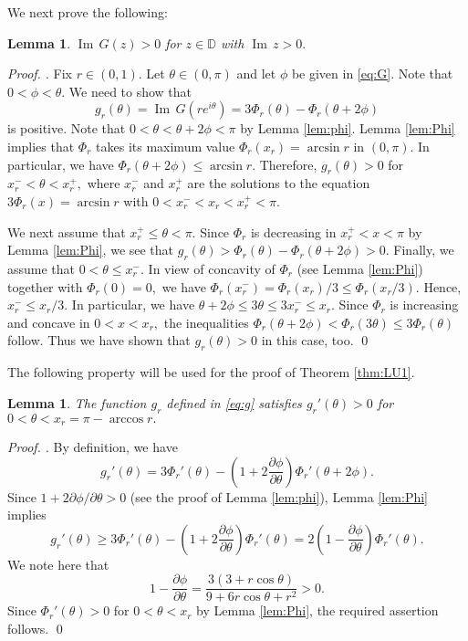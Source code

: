 \documentclass[a4paper,12pt]{amsart}
\numberwithin{equation}{section}
\newtheorem{lem}[thm]{Lemma}
\theoremstyle{definition}
\newenvironment{pf}[1][]{ \vskip 3mm
 \noindent
 \ifthenelse{\equal{#1}{}}  {{\slshape Proof. }}  {{\slshape #1.} } }{\qed\bigskip}
\begin{document}
We next prove the following:

\begin{lem}\label{lem:upper}
${{\operatorname{Im}\,}} G(z)>0$ for $z\in{{\mathbb D}}$ with ${{\operatorname{Im}\,}} z>0.$
\end{lem}

\begin{pf}
Fix $r\in(0,1).$
Let $\theta\in(0,\pi)$ and let $\phi$ be given in \eqref{eq:G}.
Note that $0<\phi<\theta.$
We need to show that
\begin{equation}\label{eq:g}
g_r(\theta)={{\operatorname{Im}\,}} G(re^{i\theta})=3\Phi_r(\theta)-\Phi_r(\theta+2\phi)
\end{equation}
is positive.
Note that $0<\theta<\theta+2\phi<\pi$ by Lemma \ref{lem:phi}.
Lemma \ref{lem:Phi} implies that $\Phi_r$ takes its maximum value
$\Phi_r(x_r)=\arcsin r$ in $(0,\pi).$
In particular, we have $\Phi_r(\theta+2\phi)\le \arcsin r.$
Therefore, $g_r(\theta)>0$ for $x_r^-<\theta<x_r^+,$
where $x_r^-$ and $x_r^+$ are the solutions to the equation
$3\Phi_r(x)=\arcsin r$ with $0<x_r^-<x_r<x_r^+<\pi.$

We next assume that $x_r^+\le \theta<\pi.$
Since $\Phi_r$ is decreasing in $x_r^+<x<\pi$ by Lemma \ref{lem:Phi},
we see that $g_r(\theta)>\Phi_r(\theta)-\Phi_r(\theta+2\phi)>0.$
Finally, we assume that $0<\theta\le x_r^-.$
In view of concavity of $\Phi_r$ (see Lemma \ref{lem:Phi})
together with $\Phi_r(0)=0,$
we have $\Phi_r(x_r^-)=\Phi_r(x_r)/3\le\Phi_r(x_r/3).$
Hence, $x_r^-\le x_r/3.$
In particular, we have $\theta+2\phi\le 3\theta\le 3x_r^-\le x_r.$
Since $\Phi_r$ is increasing and concave in $0<x<x_r,$ the inequalities
$\Phi_r(\theta+2\phi)<\Phi_r(3\theta)\le 3\Phi_r(\theta)$ follow.
Thus we have shown that $g_r(\theta)>0$ in this case, too.
\end{pf}

The following property will be used for the proof of Theorem \ref{thm:LU1}.

\begin{lem}\label{lem:g}
The function $g_r$ defined in \eqref{eq:g} satisfies
$g_r'(\theta)>0$ for $0<\theta<x_r=\pi-\arccos r.$
\end{lem}

\begin{pf}
By definition, we have
$$
g_r'(\theta)=3\Phi_r'(\theta)-
\left(1+2\frac{\partial\phi}{\partial\theta}\right)\Phi_r'(\theta+2\phi).
$$
Since $1+2\partial\phi/\partial\theta>0$ (see the proof of Lemma \ref{lem:phi}),
Lemma \ref{lem:Phi} implies
$$
g_r'(\theta)\ge 3\Phi_r'(\theta)-
\left(1+2\frac{\partial\phi}{\partial\theta}\right)\Phi_r'(\theta)
=2\left(1-\frac{\partial\phi}{\partial\theta}\right)\Phi_r'(\theta).
$$
We note here that
$$
1-\frac{\partial\phi}{\partial\theta}
=\frac{3(3+r\cos\theta)}{9+6r\cos\theta+r^2}>0.
$$
Since $\Phi_r'(\theta)>0$ for $0<\theta<x_r$ by Lemma \ref{lem:Phi},
the required assertion follows.
\end{pf}
\end{document}
